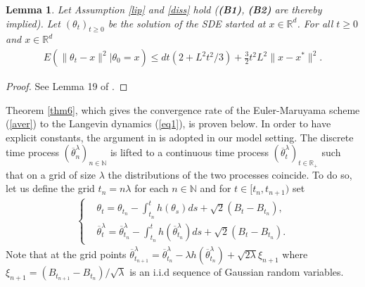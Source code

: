 \documentclass[a4paper]{article}
\newtheorem{lemma}[theorem]{Lemma}
\def\Rd{\mathbb{R}^{d}}
\def\tlb{\overline{\theta}^{\lambda}}
\def\t{{\theta}}
\begin{document}
\begin{lemma}\label{lem5}
	Let Assumption \ref{lip} and \ref{diss} hold ({\bf (B1)}, {\bf (B2)} are thereby implied). Let $(\t_t)_{t \geq 0}$ be the solution of the SDE started at $x \in \Rd$. For all $t \geq 0$ and $x \in \Rd$
	\begin{align*}
	E\left(\|\t_t-x\|^2 | \t_0=x \right) \leq dt(2+L^2t^2/3)+\tfrac{3}{2}t^2L^2 \|x-x^*\|^2.
	\end{align*}
\end{lemma}

\begin{proof}
See Lemma 19 of \cite{durmus-moulines}.
\end{proof}

Theorem \ref{thm6}, which gives the convergence rate of the Euler-Maruyama scheme (\ref{aver}) to the Langevin dynamics (\ref{eq1}), is proven below. In order to have explicit constants, the argument in \cite{durmus-moulines} is adopted in our model setting. The discrete time process $(\overline{\theta}^{\lambda}_n)_{n \in \mathbb{N}}$ is lifted to a continuous time process $(\overline{\theta}^{\lambda}_t)_{t \in \mathbb{R}_+}$ such that on a grid of size $\lambda$ the distributions of the two processes coincide. To do so, let us define the grid $t_n = n \lambda$ for each $n \in \mathbb{N}$ and for $t \in [t_n, t_{n+1})$ set
\begin{align}\label{coupling}
\begin{cases}
&\t_t=\t_{t_n}-\int_{t_n}^th(\t_s)ds+\sqrt{2}(B_t-B_{t_n}), \\
& \tlb_t=\tlb_{t_n}-\int_{t_n}^t h(\tlb_{t_n})ds+\sqrt{2}(B_t-B_{t_n}).
\end{cases}
\end{align}
Note that at the grid points $\overline{\theta}^{\lambda}_{t_{n+1}} = \overline{\theta}^{\lambda}_{t_n} - \lambda h(\overline{\theta}^{\lambda}_{t_n}) + \sqrt{2\lambda} \xi_{n+1} $ where $\xi_{n+1} = (B_{t_{n+1}} - B_{t_n})/\sqrt{\lambda}$ is an i.i.d sequence of Gaussian random variables.
\end{document}
